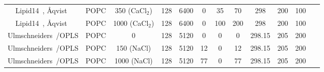 \documentclass[pre,aps,floatfix,authordate1-4,twocolumn]{revtex4-1}
\begin{document}
\begin{table}[htb]
\begin{tabular}{c c c c c c c c c c c c}
  Lipid14~\cite{dickson14}, \r{A}qvist~\cite{aqvist90}   &   POPC & 350 (CaCl$_2$) & 128 & 6400 & 0 & 35 & 70 & 298 & 200 & 100 &~\cite{lipid14POPC350mMCaClfiles}  \\
  Lipid14~\cite{dickson14}, \r{A}qvist~\cite{aqvist90}   &   POPC & 1000 (CaCl$_2$) & 128 & 6400 & 0 & 100 & 200 & 298 & 200 & 100 &~\cite{lipid14POPC1000mMCaClfiles}  \\
  \hline
  Ulmschneiders~\cite{Ulmschneider09}/OPLS\cite{??}       &   POPC & 0          & 128 & 5120 & 0 & 0  & 0 & 298.15 & 205 & 200 &~\cite{ulmschneiderPOPC0mMNaClfiles}  \\
  Ulmschneiders~\cite{Ulmschneider09}/OPLS\cite{??}       &   POPC & 150 (NaCl) & 128 & 5120 & 12 & 0  & 12 & 298.15 & 205 & 200 &~\cite{ulmschneiderPOPC150mMNaClfiles}  \\
  Ulmschneiders~\cite{Ulmschneider09}/OPLS\cite{??}       &   POPC & 1000 (NaCl) & 128 & 5120 & 77 & 0  & 77 & 298.15 & 205 & 200 &~\cite{ulmschneiderPOPC1000mMNaClfiles}  \\
\end{tabular}
\end{table} 


\end{document}
